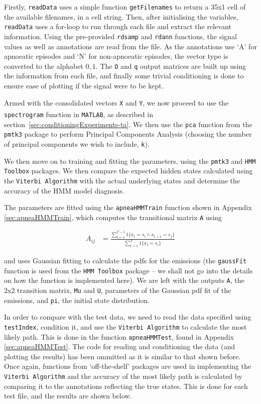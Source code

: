 Firstly, \verb!readData! uses a simple function \verb!getFilenames! to return a 35x1 cell of the available filenames, in a cell string. Then, after initialising the variables, \verb!readData! uses a for-loop to run through each file and extract the relevant information. Using the pre-provided \verb!rdsamp! and \verb!rdann! functions, the signal values as well as annotations are read from the file. As the annotations use `A' for apnoeatic episodes and `N' for non-apnoeatic episodes, the vector type is converted to the alphabet ${0,1}$. The \verb!O! and \verb!q! output matrices are built up using the information from each file, and finally some trivial conditioning is done to ensure ease of plotting if the signal were to be kept.

Armed with the consolidated vectors \verb!X! and \verb!Y!, we now proceed to use the \verb!spectrogram! function in \verb!MATLAB!\textsuperscript{\textregistered}, as described in section~\ref{sec:conditioningExperiments-ta}. We then use the \verb!pca! function from the \verb!pmtk3! package to perform Principal Components Analysis (choosing the number of principal components we wish to include, \verb!k!). 

We then move on to training and fitting the parameters, using the \verb!pmtk3! and \verb!HMM Toolbox! packages. We then compare the expected hidden states calculated using the \verb!Viterbi Algorithm! with the actual underlying states and determine the accuracy of the HMM model diagnosis.

The parameters are fitted using the \verb!apneaHMMTrain! function shown in Appendix \ref{sec:apneaHMMTrain}, which computes the transitional matrix \verb!A! using

\begin{align}
		A_{ij} & = \frac{\sum_{t = 1}^{T - 1} 1\{x_t = s_i \land x_{t + 1} = s_j\}}{\sum_{t = 1}^{T} 1\{x_t = s_i\}}
\end{align}

and uses Gaussian fitting to calculate the pdfs for the emissions (the \verb!gaussFit! function is used from the \verb!HMM Toolbox! package -- we shall not go into the details on how the function is implemented here). We are left with the outputs \verb!A!, the 2x2 transition matrix, \verb!Mu! and \verb!U!, parameters of the Gaussian pdf fit of the emissions, and \verb!pi!, the initial state distribution.

In order to compare with the test data, we need to read the data specified using \verb!testIndex!, condition it, and use the \verb!Viterbi Algorithm! to calculate the most likely path. This is done in the function \verb!apneaHMMTest!, found in Appendix \ref{sec:apneaHMMTest}. The code for reading and conditioning the data (and plotting the results) has been ommitted as it is similar to that shown before. Once again, functions from `off-the-shelf' packages are used in implementing the \verb!Viterbi Algorithm! and the accuracy of the most likely path is calculated by comparing it to the annotations reflecting the true states. This is done for each test file, and the results are shown below.

